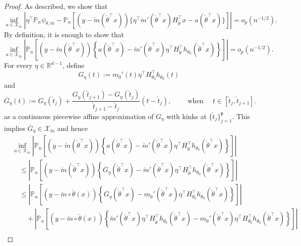 \begin{proof}
As described, we show that
\[
\inf_{a\in\mathcal{X}_{\check{m}}}\left|\eta^{\top}\mathbb{P}_n\psi_{\check{\theta}, \check{m}} - \mathbb{P}_n\left[(y-\check{m}(\check\theta^\top x))\{ \eta^\top  \check{m}'(\check\theta ^\top x) H_{\check\theta}^\top x - a(\check\theta^\top x)\}\right]\right| = o_p(n^{-1/2}).
\]
By definition, it is enough to show that
\[
\inf_{a\in\mathcal{X}_{\check{m}}}\left|\mathbb{P}_n\left[(y - \check{m}(\check{\theta}^{\top}x))\left\{a(\check{\theta}^{\top}x) - \check{m}'(\check{\theta}^{\top}x)\eta^{\top}H_{\check{\theta}}^{\top}h_{\theta_0}(\check{\theta}^{\top}x)\right\}\right]\right| = o_p(n^{-1/2}).
\]
For every $\eta\in\mathbb{R}^{d-1}$, define 
\begin{equation}\label{eq:G_def1}
 G_{\eta}(t) := m_0'(t)\eta^{\top}H_{\theta_0}^{\top}h_{\theta_0}(t)
 \end{equation} and
\begin{equation}\label{eq:Gbar_def}
\overline{G}_{\eta}(t) := G_{\eta}(\check{t}_j) + \frac{G_{\eta}(\check{t}_{j+1}) - G_{\eta}(\check{t}_j)}{\check{t}_{j+1} - \check{t}_j}(t - \check{t}_j), \qquad \text{ when } \quad t\in[\check{t}_{j}, \check{t}_{j+1}].
\end{equation}
as a continuous piecewise affine approximation of $G_{\eta}$ with kinks at $\{\check{t}_j\}_{j=1}^\mathfrak{p}$. This implies $\overline{G}_{\eta}\in\mathcal{X}_{\check{m}}$ and hence
\begin{align*}
&\inf_{a\in\mathcal{X}_{\check{m}}}\left|\mathbb{P}_n\left[(y - \check{m}(\check{\theta}^{\top}x))\left\{a(\check{\theta}^{\top}x) - \check{m}'(\check{\theta}^{\top}x)\eta^{\top}H_{\check{\theta}}^{\top}h_{\theta_0}(\check{\theta}^{\top}x)\right\}\right]\right|\\
&\quad\le \left|\mathbb{P}_n\left[(y - \check{m}(\check{\theta}^{\top}x))\left\{\overline{G}_{\eta}(\check{\theta}^{\top}x) - \check{m}'(\check{\theta}^{\top}x)\eta^{\top}H_{\check{\theta}}^{\top}h_{\theta_0}(\check{\theta}^{\top}x)\right\}\right]\right|\\
&\quad\le \left|\mathbb{P}_n\left[(y - \check{m}\circ\check{\theta}(x))\left\{\overline{G}_{\eta}(\check{\theta}^{\top}x) - m_0'(\check{\theta}^{\top}x)\eta^{\top}H_{\theta_0}^{\top}h_{\theta_0}(\check{\theta}^{\top}x)\right\}\right]\right|\\
&\qquad+ \left|\mathbb{P}_n\left[(y - \check{m}\circ\check{\theta}(x))\left\{\check{m}'(\check{\theta}^{\top}x)\eta^{\top}H_{\check{\theta}}^{\top}h_{\theta_0}(\check{\theta}^{\top}x) - m_0'(\check{\theta}^{\top}x)\eta^{\top}H_{\theta_0}^{\top}h_{\theta_0}(\check{\theta}^{\top}x)\right\}\right]\right|\\

\end{align*}
\end{proof}

